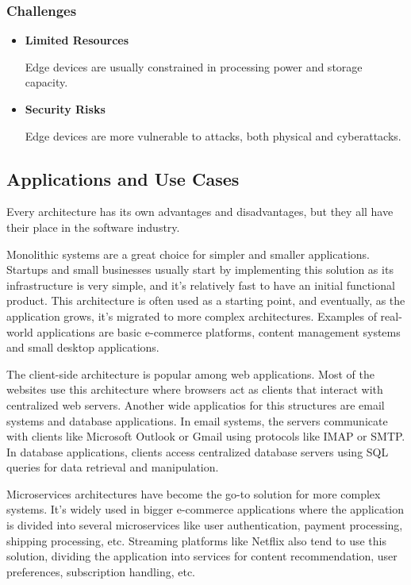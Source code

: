 \subsubsection{Challenges}
\begin{itemize}

	\item \textbf{Limited Resources}

	      Edge devices are usually constrained in processing power and storage capacity.

	\item \textbf{Security Risks}

	      Edge devices are more vulnerable to attacks, both physical and cyberattacks.

\end{itemize}

\subsection{Applications and Use Cases}
Every architecture has its own advantages and disadvantages, but they all have
their place in the software industry.

Monolithic systems are a great choice for simpler and smaller applications.
Startups and small businesses usually start by implementing this solution as
its infrastructure is very simple, and it's relatively fast to have an initial
functional product. This architecture is often used as a starting point, and
eventually, as the application grows, it's migrated to more complex architectures.
Examples of real-world applications are basic e-commerce platforms, content
management systems and small desktop applications.

The client-side architecture is popular among web applications. Most of the
websites use this architecture where browsers act as clients that interact with
centralized web servers. Another wide applicatios for this structures are email
systems and database applications. In email systems, the servers communicate
with clients like Microsoft Outlook or Gmail using protocols like IMAP or SMTP.
In database applications, clients access centralized database servers using
SQL queries for data retrieval and manipulation.

Microservices architectures have become the go-to solution for more complex
systems. It's widely used in bigger e-commerce applications where the application
is divided into several microservices like user authentication, payment processing,
shipping processing, etc. Streaming platforms like Netflix also tend to use this
solution, dividing the application into services for content recommendation, user
preferences, subscription handling, etc.

